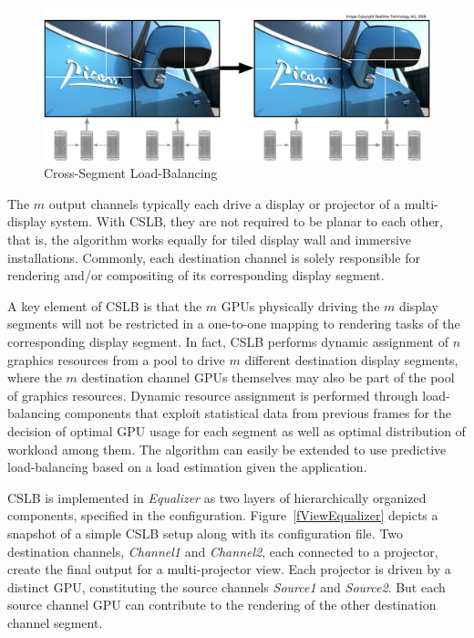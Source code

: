 \begin{figure}
  \includegraphics[width=.382\textwidth]{images/vieweq}
  \caption{\label{fvieweq}Cross-Segment Load-Balancing}
\end{figure}

The $m$ output channels typically each drive a display or projector of a
multi-display system. With CSLB, they are not required to be planar to each
other, that is, the algorithm works equally for tiled display wall and immersive
installations. Commonly, each destination channel is solely responsible for
rendering and/or compositing of its corresponding display segment.

A key element of CSLB is that the $m$ GPUs physically driving the $m$ display
segments will not be restricted in a one-to-one mapping to rendering tasks of
the corresponding display segment. In fact, CSLB performs dynamic assignment of
$n$ graphics resources from a pool to drive $m$ different destination display
segments, where the $m$ destination channel GPUs themselves may also be part of
the pool of graphics resources. Dynamic resource assignment is performed through
load-balancing components that exploit statistical data from previous frames for
the decision of optimal GPU usage for each segment as well as optimal
distribution of workload among them. The algorithm can easily be extended to use
predictive load-balancing based on a load estimation given the application.

CSLB is implemented in {\em Equalizer} as two layers of hierarchically organized
components, specified in the configuration. Figure~\ref{fViewEqualizer} depicts
a snapshot of a simple CSLB setup along with its configuration file. Two
destination channels, {\em Channel1} and {\em Channel2}, each connected to a
projector, create the final output for a multi-projector view. Each projector is
driven by a distinct GPU, constituting the source channels {\em Source1} and
{\em Source2}. But each source channel GPU can contribute to the rendering of
the other destination channel segment.


